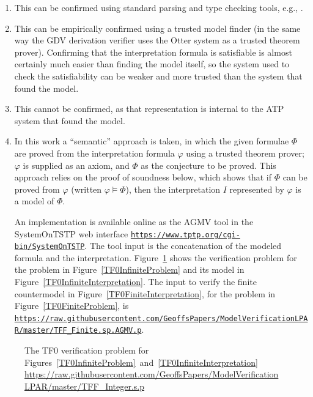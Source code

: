 \documentclass{easychair}
\newcommand{\smalltt}[1]{\small \texttt{#1}}
\begin{document}
\begin{enumerate}
\item This can be confirmed using standard parsing and type checking tools, e.g., \cite{VS06,HR15}.
\item This can be empirically confirmed using a trusted model finder (in the same way the GDV 
      derivation verifier \cite{Sut06} uses the Otter system \cite{McC03-Otter} as a trusted 
      theorem prover).
      Confirming that the interpretation formula is satisfiable is almost certainly much 
      easier than finding the model itself, so the system used to check the satisfiability can 
      be weaker and more trusted than the system that found the model.
\item This cannot be confirmed, as that representation is internal to the ATP system that found
      the model.
\item In this work a ``semantic'' approach is taken, in which the given formulae $\Phi$ are proved 
      from the interpretation formula $\varphi$ using a trusted theorem prover; $\varphi$ is 
      supplied as an axiom, and $\Phi$ as the conjecture to be proved.
      This approach relies on the proof of soundness below, which shows that if $\Phi$ can be 
      proved from $\varphi$ (written $\varphi \models \Phi$), then the interpretation $I$ 
      represented by $\varphi$ is a model of $\Phi$.

      An implementation is available online as the AGMV tool in the SystemOnTSTP \cite{Sut07-CSR} 
      web interface {\smalltt{\url{https://www.tptp.org/cgi-bin/SystemOnTSTP}}}.
      The tool input is the concatenation of the modeled formula and the interpretation.
      Figure~\ref{TF0InfiniteVerification} shows the verification problem for the problem in 
      Figure~\ref{TF0InfiniteProblem} and its model in Figure~\ref{TF0InfiniteInterpretation}.
      The input to verify the finite countermodel in Figure~\ref{TF0FiniteInterpretation}, for the 
      problem in Figure~\ref{TF0FiniteProblem}, is
      {\smalltt{\url{https://raw.githubusercontent.com/GeoffsPapers/ModelVerificationLPAR/master/TFF_Finite.sp.AGMV.p}}}.
\end{enumerate}

\begin{figure}[htbp]
\small
{}

\caption{The TF0 verification problem for 
Figures~\ref{TF0InfiniteProblem}~and~\ref{TF0InfiniteInterpretation}\\
{\footnotesize \url{https://raw.githubusercontent.com/GeoffsPapers/ModelVerificationLPAR/master/TFF_Integer.s.p}}}
\label{TF0InfiniteVerification}
\end{figure}
\end{document}

